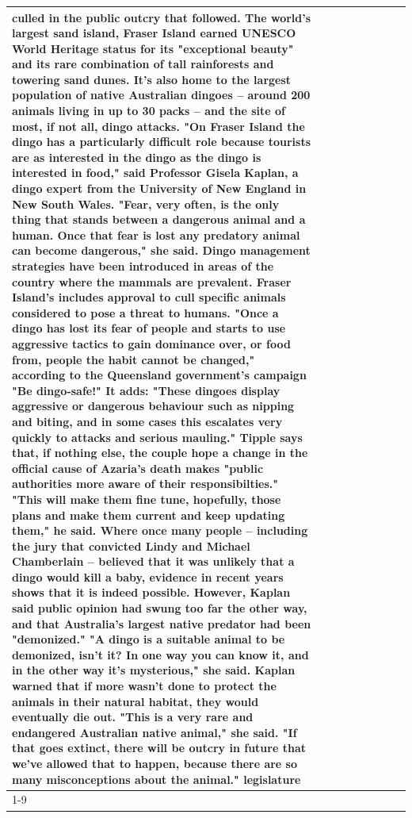 \begin{table}[H]
\begin{tabular}{lllrlllll}
culled in the public outcry that followed. The world's largest sand island, Fraser Island earned UNESCO World Heritage status for its "exceptional beauty" and its rare combination of tall rainforests and towering sand dunes. It's also home to the largest population of native Australian dingoes -- around 200 animals living in up to 30 packs -- and the site of most, if not all, dingo attacks. "On Fraser Island the dingo has a particularly difficult role because tourists are as interested in the dingo as the dingo is interested in food," said Professor Gisela Kaplan, a dingo expert from the University of New England in New South Wales. "Fear, very often, is the only thing that stands between a dangerous animal and a human. Once that fear is lost any predatory animal can become dangerous," she said. Dingo management strategies have been introduced in areas of the country where the mammals are prevalent. Fraser Island's includes approval to cull specific animals considered to pose a threat to humans. "Once a dingo has lost its fear of people and starts to use aggressive tactics to gain dominance over, or food from, people the habit cannot be changed," according to the Queensland government's campaign "Be dingo-safe!" It adds: "These dingoes display aggressive or dangerous behaviour such as nipping and biting, and in some cases this escalates very quickly to attacks and serious mauling." Tipple says that, if nothing else, the couple hope a change in the official cause of Azaria's death makes "public authorities more aware of their responsibilties." "This will make them fine tune, hopefully, those plans and make them current and keep updating them," he said. Where once many people -- including the jury that convicted Lindy and Michael Chamberlain -- believed that it was unlikely that a dingo would kill a baby, evidence in recent years shows that it is indeed possible. However, Kaplan said public opinion had swung too far the other way, and that Australia's largest native predator had been "demonized." "A dingo is a suitable animal to be demonized, isn't it? In one way you can know it, and in the other way it's mysterious," she said. Kaplan warned that if more wasn't done to protect the animals in their natural habitat, they would eventually die out. "This is a very rare and endangered Australian native animal," she said. "If that goes extinct, there will be outcry in future that we've allowed that to happen, because there are so many misconceptions about the animal." legislature \\
\cline{1-9}

\end{tabular}
\end{table}
